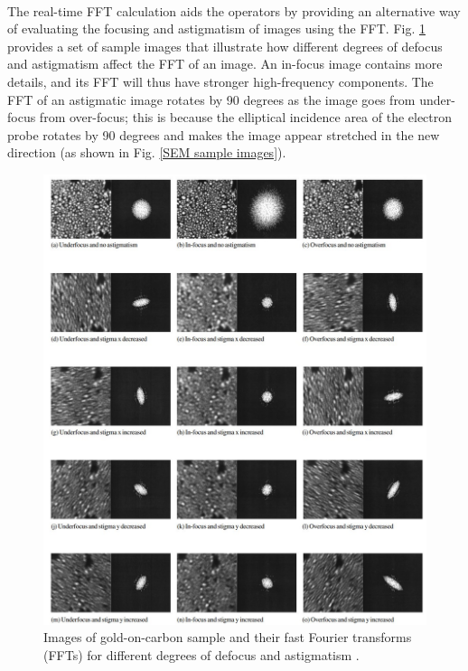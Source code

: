 \documentclass[12pt, twocolumn]{report}
\begin{document}
\paragraph{}
The real-time FFT calculation aids the operators by providing an alternative way of evaluating the focusing and astigmatism of images using the FFT. Fig. \ref{SEM astigmatism} provides a set of sample images that illustrate how different degrees of defocus and astigmatism affect the FFT of an image. An in-focus image contains more details, and its FFT will thus have stronger high-frequency components. The FFT of an astigmatic image rotates by 90 degrees as the image goes from under-focus from over-focus; this is because the elliptical incidence area of the electron probe rotates by 90 degrees and makes the image appear stretched in the new direction (as shown in Fig. \ref{SEM sample images}).

\begin{figure}
    \centering
    \includegraphics[width=1.05\textwidth]{Figures/SEM astigmatism and FFT.jpg}
    \caption{Images of gold-on-carbon sample and their fast Fourier transforms (FFTs) for different degrees of defocus and astigmatism \cite{SEM correction algorithm}.}
    \label{SEM astigmatism}
\end{figure}
\end{document}
